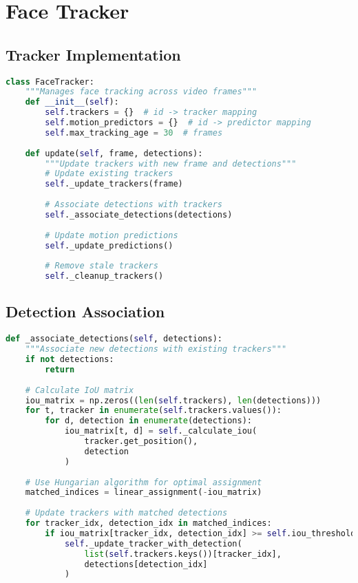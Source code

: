 \section{Face Tracker}

\subsection{Tracker Implementation}
\begin{lstlisting}[language=Python]
class FaceTracker:
    """Manages face tracking across video frames"""
    def __init__(self):
        self.trackers = {}  # id -> tracker mapping
        self.motion_predictors = {}  # id -> predictor mapping
        self.max_tracking_age = 30  # frames
        
    def update(self, frame, detections):
        """Update trackers with new frame and detections"""
        # Update existing trackers
        self._update_trackers(frame)
        
        # Associate detections with trackers
        self._associate_detections(detections)
        
        # Update motion predictions
        self._update_predictions()
        
        # Remove stale trackers
        self._cleanup_trackers()
\end{lstlisting}

\subsection{Detection Association}
\begin{lstlisting}[language=Python]
def _associate_detections(self, detections):
    """Associate new detections with existing trackers"""
    if not detections:
        return
        
    # Calculate IoU matrix
    iou_matrix = np.zeros((len(self.trackers), len(detections)))
    for t, tracker in enumerate(self.trackers.values()):
        for d, detection in enumerate(detections):
            iou_matrix[t, d] = self._calculate_iou(
                tracker.get_position(),
                detection
            )
            
    # Use Hungarian algorithm for optimal assignment
    matched_indices = linear_assignment(-iou_matrix)
    
    # Update trackers with matched detections
    for tracker_idx, detection_idx in matched_indices:
        if iou_matrix[tracker_idx, detection_idx] >= self.iou_threshold:
            self._update_tracker_with_detection(
                list(self.trackers.keys())[tracker_idx],
                detections[detection_idx]
            )
\end{lstlisting}

